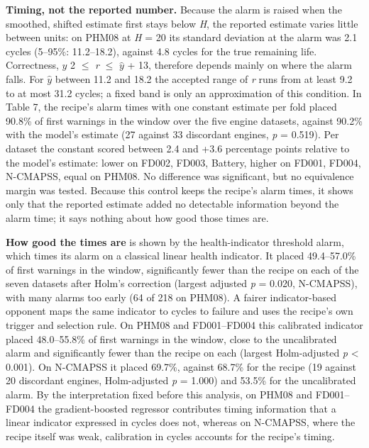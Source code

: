 \documentclass[a4paper,fleqn,doubleblind]{cas-dc}
\begin{document}
\textbf{Timing, not the reported number.} Because the alarm is raised when the smoothed, shifted estimate first stays below \textit{H}, the reported estimate varies little between units: on PHM08 at \textit{H} = 20 its standard deviation at the alarm was 2.1 cycles (5--95\%: 11.2--18.2), against 4.8 cycles for the true remaining life. Correctness, $\hat{y}$ \textminus{} 2 $\le$ \textit{r} $\le$ $\hat{y}$ + 13, therefore depends mainly on where the alarm falls. For $\hat{y}$ between 11.2 and 18.2 the accepted range of \textit{r} runs from at least 9.2 to at most 31.2 cycles; a fixed band is only an approximation of this condition. In Table 7, the recipe's alarm times with one constant estimate per fold placed 90.8\% of first warnings in the window over the five engine datasets, against 90.2\% with the model's estimate (27 against 33 discordant engines, \textit{p} = 0.519). Per dataset the constant scored between \textminus{}2.4 and +3.6 percentage points relative to the model's estimate: lower on FD002, FD003, Battery, higher on FD001, FD004, N-CMAPSS, equal on PHM08. No difference was significant, but no equivalence margin was tested. Because this control keeps the recipe's alarm times, it shows only that the reported estimate added no detectable information beyond the alarm time; it says nothing about how good those times are.

\textbf{How good the times are} is shown by the health-indicator threshold alarm, which times its alarm on a classical linear health indicator. It placed 49.4--57.0\% of first warnings in the window, significantly fewer than the recipe on each of the seven datasets after Holm's correction (largest adjusted \textit{p} = 0.020, N-CMAPSS), with many alarms too early (64 of 218 on PHM08). A fairer indicator-based opponent maps the same indicator to cycles to failure and uses the recipe's own trigger and selection rule. On PHM08 and FD001--FD004 this calibrated indicator placed 48.0--55.8\% of first warnings in the window, close to the uncalibrated alarm and significantly fewer than the recipe on each (largest Holm-adjusted \textit{p} < 0.001). On N-CMAPSS it placed 69.7\%, against 68.7\% for the recipe (19 against 20 discordant engines, Holm-adjusted \textit{p} = 1.000) and 53.5\% for the uncalibrated alarm. By the interpretation fixed before this analysis, on PHM08 and FD001--FD004 the gradient-boosted regressor contributes timing information that a linear indicator expressed in cycles does not, whereas on N-CMAPSS, where the recipe itself was weak, calibration in cycles accounts for the recipe's timing.
\end{document}
